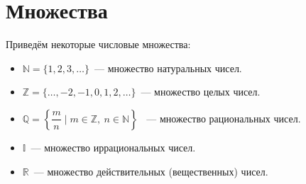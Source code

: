 \section{Множества}
      Приведём некоторые числовые множества:
\begin{itemize}
	\item $\mathbb N = \{ 1, 2, 3, \dots \}$~--- множество натуральных чисел.
	\item $\mathbb Z = \{ \dots, -2, -1, 0, 1, 2, \dots \}$~--- множество целых чисел.
	\item $\mathbb Q = \left\{ \dfrac{m}n \mid m \in \mathbb Z, \ n \in \mathbb N \right\}$
	~--- множество рациональных чисел.
	\item $\mathbb I$~--- множество иррациональных чисел.
	\item $\mathbb R$~--- множество действительных (вещественных) чисел.
\end{itemize}